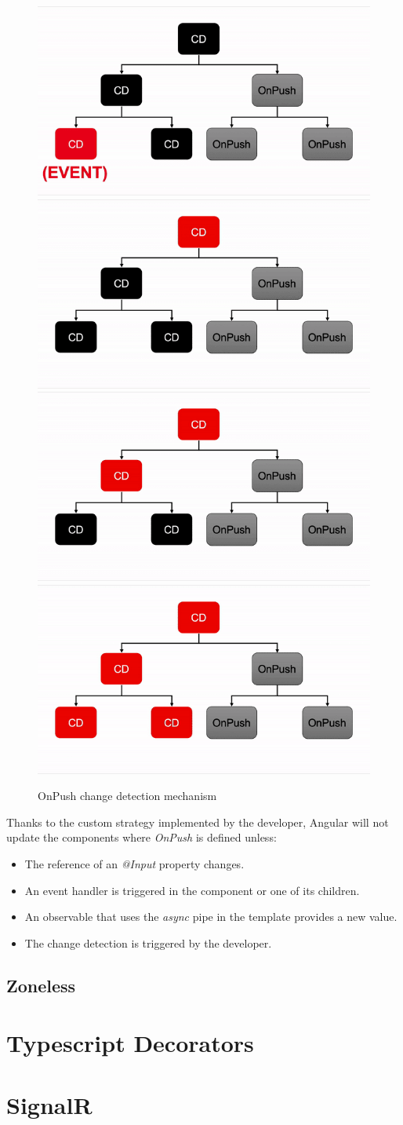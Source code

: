 \begin{figure}[h!]
    \caption{OnPush change detection mechanism}
    \centering
    \includegraphics[width=.49\textwidth]{img/onpush-cycle1.png} 
    \includegraphics[width=.49\textwidth]{img/onpush-cycle2.png} 
    \includegraphics[width=.49\textwidth]{img/onpush-cycle3.png} 
    \includegraphics[width=.49\textwidth]{img/onpush-cycle4.png} 
\end{figure}

Thanks to the custom strategy implemented by the developer, Angular will not update the components where \emph{OnPush} is defined unless:
\begin{itemize}
    \item The reference of an \emph{@Input} property changes.
    \item An event handler is triggered in the component or one of its children.
    \item An observable that uses the \emph{async} pipe in the template provides a new value.
    \item The change detection is triggered by the developer.
\end{itemize}
\subsection{Zoneless}




\section{Typescript Decorators}

\section{SignalR}
